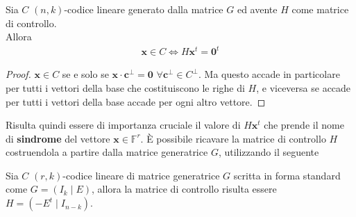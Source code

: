 \begin{teorema}\label{teorFondMatrContrllo}
   Sia $C$ $(n,k)$-codice lineare generato dalla matrice $G$ ed avente $H$ come matrice di controllo.\\
   Allora
   \begin{align*}
      \mathbf{x} \in C \iff H \mathbf{x}^{t} = \mathbf{0}^{t}
   \end{align*}
\end{teorema}
\begin{proof}
   $\mathbf{x}\in C$ se e solo se $\mathbf{x}\cdot \mathbf{c}^{\perp} = \mathbf{0}$ $\forall \mathbf{c}^{\perp} \in C^{\perp}$. Ma questo accade in particolare per tutti i vettori della base che costituiscono le righe di $H$, e viceversa se accade per tutti i vettori della base accade per ogni altro vettore.
\end{proof}
\noindent
Risulta quindi essere di importanza cruciale il valore di $H \mathbf{x}^{t}$ che prende il nome di {\bf sindrome} del vettore $\mathbf{x} \in \mathbb{F}^{r}$.
\noindent
È possibile ricavare la matrice di controllo $H$ costruendola a partire dalla matrice generatrice $G$, utilizzando il seguente
\begin{teorema}
   Sia $C$ $(r,k)$-codice lineare di matrice generatrice $G$ scritta in forma standard come $G = (I_{k} \mid E)$, allora la matrice di controllo risulta essere $H = (-E^{t} \mid I_{n-k})$.
\end{teorema}
